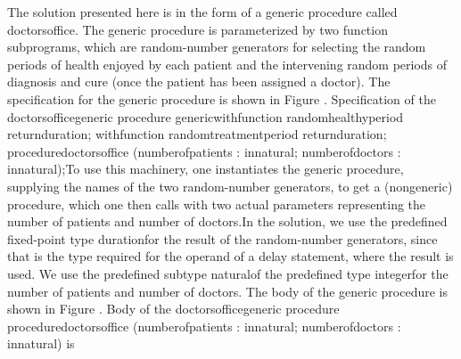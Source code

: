 \Para[]The solution presented here is in the form of a generic procedure
called \tyxffmxmono[]doctors\Symuns[]office\tyxffmxendmono[]. The
generic procedure is parameterized by two function subprograms, which
are random-number generators for selecting the random periods of health
enjoyed by each patient and the intervening random periods of diagnosis
and cure (once the patient has been assigned a doctor). The specification
for the generic procedure is shown in Figure .
\Parbox[]
Specification of the %
\tyxffmxmono[]doctors\Symuns[]office\tyxffmxendmono[] generic procedure%
\FgEndcap[]
\Comp[]\tyxtstxbf[]generic\tyxtstxendbf[]
   \tyxtstxbf[]with\tyxtstxendbf[] \tyxtstxbf[]function%
\tyxtstxendbf[] random\Symuns[]healthy\Symuns[]period   %
\tyxtstxbf[]return\tyxtstxendbf[] duration;
   \tyxtstxbf[]with\tyxtstxendbf[] \tyxtstxbf[]function%
\tyxtstxendbf[] random\Symuns[]treatment\Symuns[]period %
\tyxtstxbf[]return\tyxtstxendbf[] duration;
\tyxtstxbf[]procedure\tyxtstxendbf[] doctors\Symuns[]office (number\Symuns[]of\Symuns[]patients : %
\tyxtstxbf[]in\tyxtstxendbf[] natural;
                          number\Symuns[]of\Symuns[]doctors  : %
\tyxtstxbf[]in\tyxtstxendbf[] natural);\Endcomp[]
\EndParbox[]
\FgEndblock[]
 To use this machinery, one instantiates the generic procedure, supplying
the names of the two random-number generators, to get a (nongeneric)
procedure, which one then calls with two actual parameters representing
the number of patients and number of doctors.\Endpara[]
\Para[]In the solution, we use the predefined fixed-point type %
\tyxffmxmono[]duration\tyxffmxendmono[] for the result of the random-number
generators, since that is the type required for the operand of a delay
statement, where the result is used. We use the predefined subtype
\tyxffmxmono[]natural\tyxffmxendmono[] of the predefined type %
\tyxffmxmono[]integer\tyxffmxendmono[] for the number of patients
and number of doctors. The body of the generic procedure is shown
in Figure .
\FgBlock[]
\Parbox[]
Body of the %
\tyxffmxmono[]doctors\Symuns[]office\tyxffmxendmono[] generic procedure%
\FgEndcap[]
\Comp[]\tyxtstxbf[]procedure\tyxtstxendbf[] doctors\Symuns[]office (number\Symuns[]of\Symuns[]patients : %
\tyxtstxbf[]in\tyxtstxendbf[] natural;
                          number\Symuns[]of\Symuns[]doctors  : %
\tyxtstxbf[]in\tyxtstxendbf[] natural) \tyxtstxbf[]is%
\tyxtstxendbf[]
